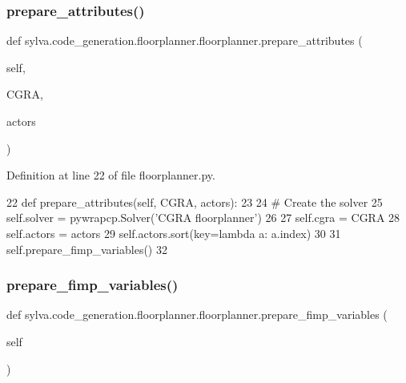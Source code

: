 \subsubsection{\texorpdfstring{prepare\+\_\+attributes()}{prepare\_attributes()}}
{\footnotesize\ttfamily def sylva.\+code\+\_\+generation.\+floorplanner.\+floorplanner.\+prepare\+\_\+attributes (\begin{DoxyParamCaption}\item[{}]{self,  }\item[{}]{C\+G\+RA,  }\item[{}]{actors }\end{DoxyParamCaption})}



Definition at line 22 of file floorplanner.\+py.


\begin{DoxyCode}
22     \textcolor{keyword}{def }prepare\_attributes(self, CGRA, actors):
23 
24         \textcolor{comment}{# Create the solver}
25         self.solver = pywrapcp.Solver(\textcolor{stringliteral}{'CGRA floorplanner'})
26 
27         self.cgra = CGRA
28         self.actors = actors
29         self.actors.sort(key=\textcolor{keyword}{lambda} a: a.index)
30 
31         self.prepare\_fimp\_variables()
32 
\end{DoxyCode}
\mbox{\label{classsylva_1_1code__generation_1_1floorplanner_1_1floorplanner_a387bfe2b35c791b09f18bf891f94d101}} 
\subsubsection{\texorpdfstring{prepare\+\_\+fimp\+\_\+variables()}{prepare\_fimp\_variables()}}
{\footnotesize\ttfamily def sylva.\+code\+\_\+generation.\+floorplanner.\+floorplanner.\+prepare\+\_\+fimp\+\_\+variables (\begin{DoxyParamCaption}\item[{}]{self }\end{DoxyParamCaption})}



